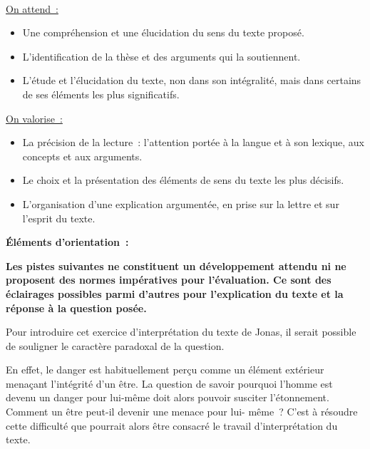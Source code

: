 \vfill{~}\clearpage

{\underline{On attend~:}
\begin{itemize}
\item Une compréhension et une élucidation du sens du texte proposé.
\item L'identification de la thèse et des arguments qui la soutiennent.
\item L'étude et l'élucidation du texte, non dans son intégralité, mais dans certains de ses
éléments les plus significatifs.
\end{itemize}

\underline{On valorise~:}
\begin{itemize}
\item La précision de la lecture~: l'attention portée à la langue et à son lexique, aux concepts et
aux arguments.
\item Le choix et la présentation des éléments de sens du texte les plus décisifs.
\item L'organisation d'une explication argumentée, en prise sur la lettre et sur l'esprit du texte.
\end{itemize}

\bigskip

\textbf{Éléments d'orientation~:}

\textbf{Les pistes suivantes ne constituent un développement attendu ni ne proposent des
normes impératives pour l'évaluation. Ce sont des éclairages possibles parmi d'autres
pour l'explication du texte et la réponse à la question posée.}

Pour introduire cet exercice d'interprétation du texte de Jonas, il serait possible de souligner
le caractère paradoxal de la question.

En effet, le danger est habituellement perçu comme un élément extérieur menaçant
l'intégrité d'un être. La question de savoir pourquoi l'homme est devenu un danger pour lui-même
doit alors pouvoir susciter l'étonnement. Comment un être peut-il devenir une menace pour lui-
même~? C'est à résoudre cette difficulté que pourrait alors être consacré le travail d'interprétation
du texte.

}
